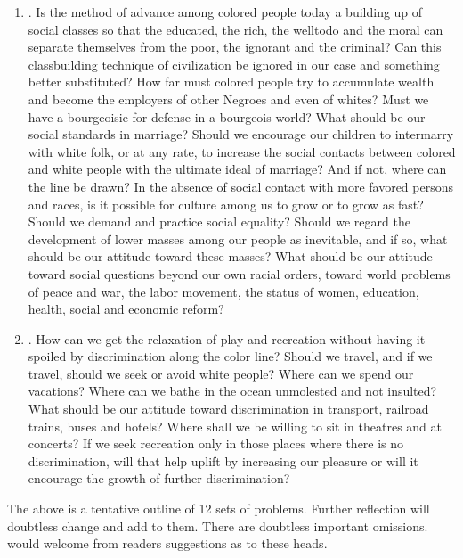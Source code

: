 \documentclass[letterpaper,10pt,english]{jupyterBook}
\begin{document}
\begin{enumerate}
\item {} 
\sphinxAtStartPar
{}. Is the method of advance among colored people today a building up of social classes so that the educated, the rich, the well\sphinxhyphen{}to\sphinxhyphen{}do and the moral can separate themselves from the poor, the ignorant and the criminal? Can this class\sphinxhyphen{}building technique of civilization be ignored in our case and something better substituted? How far must colored people try to accumulate wealth and become the employers of other Negroes and even of whites? Must we have a bourgeoisie for defense in a bourgeois world? What should be our social standards in marriage? Should we encourage our children to inter\sphinxhyphen{}marry with white folk, or at any rate, to increase the social contacts between colored and white people with the ultimate ideal of marriage? And if not, where can the line be drawn? In the absence of social contact with more favored persons and races, is it possible for culture among us to grow or to grow as fast? Should we demand and practice social equality? Should we regard the development of lower masses among our people as inevitable, and if so, what should be our attitude toward these masses? What should be our attitude toward social questions beyond our own racial orders, toward world problems of peace and war, the labor movement, the status of women, education, health, social and economic reform?

\item {} 
\sphinxAtStartPar
{}. How can we get the relaxation of play and recreation without having it spoiled by discrimination along the color line? Should we travel, and if we travel, should we seek or avoid white people? Where can we spend our vacations? Where can we bathe in the ocean unmolested and not insulted? What should be our attitude toward discrimination in transport, railroad trains, buses and hotels? Where shall we be willing to sit in theatres and at concerts? If we seek recreation only in those places where there is no discrimination, will that help uplift by increasing our pleasure or will it encourage the growth of further discrimination?

\end{enumerate}

\sphinxAtStartPar
The above is a tentative outline of 12 sets of problems. Further reflection will doubtless change and add to them. There are doubtless important omissions.  would welcome from readers suggestions as to these heads.
\end{document}
